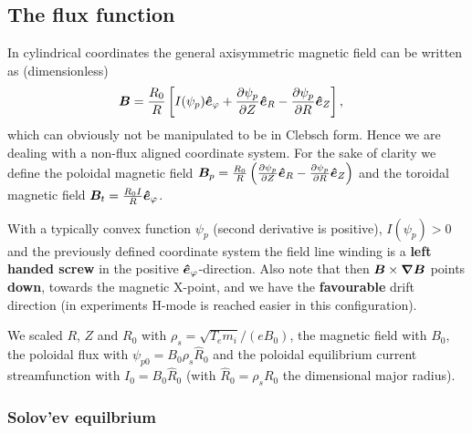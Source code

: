 \subsection{The flux function}
In cylindrical coordinates the general axisymmetric  magnetic field can be written as (dimensionless)
\begin{align}
 {\boldsymbol{B}} &= \frac{R_0}{R}\left[I(\psi_p) \bm{\hat{e}}_{\varphi} + \frac{\partial
 \psi_p}{\partial Z} \bm{\hat{e}}_R -  \frac{\partial \psi_p}{\partial R} \bm{\hat{e}}_Z\right] ,
\end{align}
which can obviously not be manipulated to be in Clebsch form.
Hence we are dealing with a non-flux aligned coordinate system.
For the sake of clarity we define the poloidal magnetic field \( {\boldsymbol{B}}_p = \frac{R_0}{R}\left( \frac{\partial \psi_p}{\partial Z}\bm{\hat{e}}_R - \frac{\partial \psi_p}{\partial R}\bm{\hat{e}}_Z\right)
\) and the toroidal magnetic field \({\boldsymbol{B}}_t =\frac{R_0I}{R} \bm{\hat{e}}_{\varphi}\).
\begin{tcolorbox}[title=Note]
With a typically convex function $\psi_p$ (second derivative is
positive), $I(\psi_p)>0$ and the previously defined coordinate system the field
line winding is a {\bf left handed screw} in the positive $\bm{\hat{e}}_\varphi$-direction.
Also note that then ${\boldsymbol{B}}\times{\boldsymbol{\nabla}}{\boldsymbol{B}}$ points {\bf down}, towards the magnetic X-point,
and we have the {\bf favourable} drift direction (in experiments H-mode
is reached easier in this configuration).
\end{tcolorbox}


We scaled $R$, $Z$ and $R_0$ with $\rho_s = \sqrt{T_e m_i}/(eB_0)$, the
magnetic field with $B_0$, the poloidal flux with $\psi_{p0} = B_0\rho_s \hat
R_0$ and the poloidal equilibrium current streamfunction with $I_0 = B_0 \hat R_0$ (with $\hat R_0 =
\rho_s R_0$ the dimensional major radius).
\subsubsection{Solov'ev equilbrium}\label{sec:solovev}

